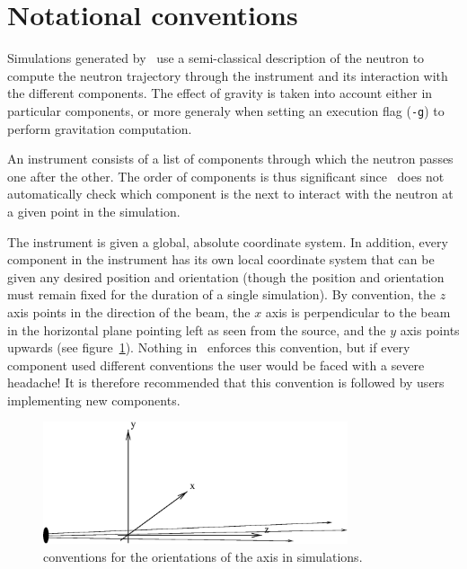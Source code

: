 \section{Notational conventions}

Simulations generated by \MCS\ use a semi-classical description of the
neutron to compute the neutron trajectory through the instrument and its
interaction with the different components. The effect of gravity is
taken  into account either in particular components, or more generaly
when setting an execution flag (\verb+-g+) to perform gravitation
computation. 

An instrument consists of a list of components through which the neutron
passes one after the other. The order of components is thus significant
since \MCS\ does not automatically check which component is the next to
interact with the neutron at a given point in the simulation.

The instrument is given a global, absolute coordinate system. In
addition, every component in the instrument has its own local coordinate
system that can be given any desired position and orientation (though
the position and orientation must remain fixed for the duration of a
single simulation). 
By convention, the $z$ axis points in the direction of the beam, the $x$ axis
is perpendicular to the beam in the horizontal plane pointing left as seen
from the source, and the $y$ axis points upwards (see figure~\ref{f:axis}).
Nothing in \MCS\ enforces this convention, but if every component used
different conventions the user would be faced with a severe headache! It is
therefore recommended that this convention is followed by users implementing
new components.
\begin{figure}
  \begin{center}
    \includegraphics[width=0.8\textwidth]{figures/axis-conventions.eps}
  \end{center}
\caption{conventions for the orientations of the axis in simulations.}
\label{f:axis}
\end{figure}

